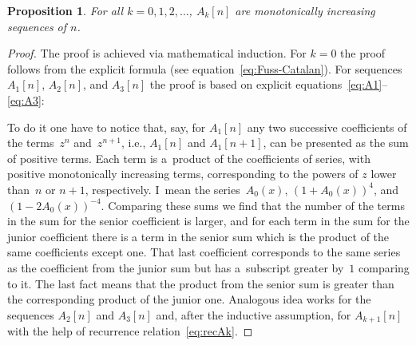 \documentclass[pdftex]{sigma}
\numberwithin{equation}{section}
\newtheorem{Proposition}[Theorem]{Proposition}
 { \theoremstyle{definition}
\newtheorem{Remark}[Theorem]{Remark} }
\begin{document}
\begin{Proposition}\label{prop:Akn-monotonicity}
For all $k=0,1,2,\ldots$, $A_k[n]$ are monotonically increasing sequences of $n$.
\end{Proposition}
\begin{proof}
The proof is achieved via mathematical induction. For $k=0$ the proof follows from
the explicit formula (see equation~\eqref{eq:Fuss-Catalan}). For sequences $A_1[n]$,
$A_2[n]$, and $A_3[n]$ the proof is based on explicit equations~\eqref{eq:A1}--\eqref{eq:A3}:

To do it one have to notice that, say, for $A_1[n]$ any two successive coefficients of the terms~$z^n$ and~$z^{n+1}$, i.e., $A_1[n]$ and $A_1[n+1]$, can be presented as the sum of positive terms.
Each term is a~product of the coefficients of series, with positive monotonically increasing terms,
corresponding to the powers of $z$ lower than~$n$ or $n+1$, respectively. I~mean the series~$A_0(x)$,
$(1+A_0(x))^4$, and $(1-2A_0(x))^{-4}$. Comparing these sums we find that the number of the terms in
the sum for the senior coefficient is larger, and for each term in the sum for the junior coefficient there
is a term in the senior sum which is the product of the same coefficients except one. That last coefficient
corresponds to the same series as the coefficient from the junior sum but has a~subscript greater by~$1$
comparing to it. The last fact means that the product from the senior sum is greater than the corresponding product
of the junior one. Analogous idea works for the sequences $A_2[n]$ and $A_3[n]$ and, after the inductive assumption,
for $A_{k+1}[n]$ with the help of recurrence relation~\eqref{eq:recAk}.
\end{proof}
\end{document}

